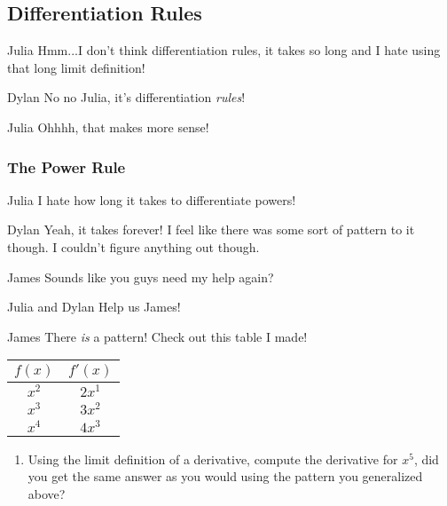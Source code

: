 \documentclass{ximera}
\begin{document}
\subsection{Differentiation Rules}
\begin{dialogue}
\item[Julia] Hmm...I don't think differentiation rules, it takes so long and I hate using that long limit definition!
\item[Dylan] No no Julia, it's differentiation \textit{rules}!
\item[Julia] Ohhhh, that makes more sense!

\end{dialogue}
\subsubsection{The Power Rule}
\begin{dialogue}
\item[Julia] I hate how long it takes to differentiate powers!
\item[Dylan] Yeah, it takes forever! I feel like there was some sort of pattern to it though. I couldn't figure anything out though.
\item[James] Sounds like you guys need my help again?
\item[Julia and Dylan] Help us James!
\item[James] There \textit{is} a pattern! Check out this table I made!
\begin{center}
\begin{tabular}{c|c}
$f(x)$ & $f'(x)$ \\
\hline
$x^2$ & $2x^1$ \\
$x^3$ & $3x^2$ \\
$x^4$ & $4x^3$ 
\end{tabular}
\end{center}
\begin{enumerate}


\begin{question}
Question goes here!
\begin{freeResponse}
This is the model solution %
\end{freeResponse}
\end{question}

\item {Using the limit definition of a derivative, compute the derivative for $x^5$, did you get the same answer as you would using the pattern you generalized above?}
\end{enumerate}

\end{dialogue}
\end{document}
